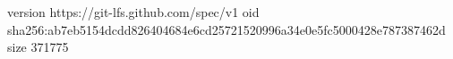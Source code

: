 version https://git-lfs.github.com/spec/v1
oid sha256:ab7eb5154dcdd826404684e6cd25721520996a34e0e5fc5000428e787387462d
size 371775
